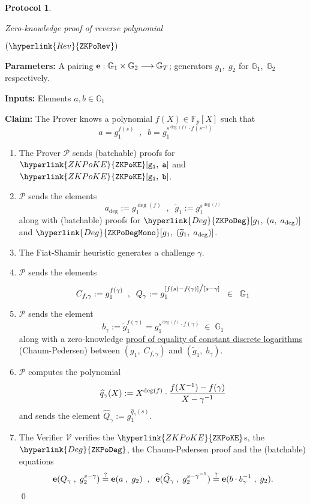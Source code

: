 \documentclass[11pt, lettersize, notitlepage, leqno, footskip=0.6cm]{article}
\newcommand{\bFp}{\mathbb{F}_p}
\newcommand{\lra}{\longrightarrow}
\newcommand{\wti}{\widetilde}
\newcommand{\mc}{\mathcal}
\newcommand{\mb}{\mathbb}
\newcommand{\mbf}{\mathbf}
\newcommand{\what}{\widehat}
\newcommand{\mP}{\mc{P}}
\newcommand{\V}{\mc{V}}
\newcommand{\vs}{\vspace{-0.15cm}}
\newcommand{\noin}{\noindent}
\newcommand{\sta}{\stackrel{?}{=}}
\newcommand{\e}{\mbf{e}}
\newtheorem{Prot}[Thm]{Protocol}
\numberwithin{equation}{section}
\begin{document}
\begin{mdframed}
\begin{Prot} \hypertarget{Rev}{Zero-knowledge proof of reverse polynomial} $(\hyperlink{Rev}{\tt{ZKPoRev}})$\end{Prot}  

\noin \textbf{Parameters:} A pairing ${\bf{e}}:\mb{G}_1\times \mb{G}_2\lra \mb{G}_T$; generators $g_1,\;g_2$ for $\mb{G}_1,\; \mb{G}_2$ respectively.


\noindent \textbf{Inputs:} Elements $a, b \in \mb{G}_1$

\noin \textbf{Claim:} The Prover knows a polynomial $f(X)\in \bFp[X]$ such that \vs $$ a = g_1^{f(s)}\;\;,\;\;b = g_1^{s^{\deg(f)} \cdot f(s^{-1})}  $$

\begin{enumerate}[wide, labelwidth=!, labelindent=0pt, itemsep=-0.2ex]

\item The Prover $\mP$ sends (batchable) proofs for $\hyperlink{ZKPoKE}{\tt{ZKPoKE}}[g_1,\;a]$ and $\hyperlink{ZKPoKE}{\tt{ZKPoKE}}[g_1,\;b]$.

\item $\mP$ sends the elements $$a_{\deg}:= g_1^{\deg(f)}\;\;, \;\; \wti{g}_1:= g_1^{s^{\deg(f)}}  $$ along with (batchable) proofs for $\hyperlink{Deg}{\tt{ZKPoDeg}}[g_1,\;(a,\;a_{\deg})]$ and $\hyperlink{Deg}{\tt{ZKPoDegMono}}[g_1,\;(\wti{g}_1,\;a_{\deg})]$.

\item The Fiat-Shamir heuristic generates a challenge $\gamma$.

\item $\mP$ sends the elements \vspace{-3mm} $$C_{f,\gamma}:= g_1^{f(\gamma)}\;\;,\;\; Q_{\gamma}:= g_1^{[f(s)-f(\gamma)]\big/[s-\gamma]}\;\;\in\;\;\mb{G}_1 \vs $$

\item $\mP$ sends the element $$b_{\gamma}:= \wti{g}_1^{f(\gamma)} = g_1^{s^{\deg(f)}\cdot f(\gamma)}\;\in\;\mb{G}_1 $$ along with a zero-knowledge \hyperlink{CP}{proof of equality of constant discrete logarithms} (Chaum-Pedersen) between $(g_1,\; C_{f,\gamma})$ and $(\wti{g}_1,\; b_{\gamma})$.

\item $\mP$ computes the polynomial \vspace{-2mm} $$\what{q}_{\gamma}(X):= X^{\deg(f)}\cdot \frac{f(X^{-1}) - f(\gamma)}{X-\gamma^{-1}} \vs $$ and sends the element $\what{Q}_{\gamma}:= g_1^{\what{q}_{\gamma}(s)}$. 

\item The Verifier $\V$ verifies the $\hyperlink{ZKPoKE}{\tt{ZKPoKE}}$s, the $\hyperlink{Deg}{\tt{ZKPoDeg}}$, the Chaum-Pedersen proof and the (batchable) equations \vs $$ \e(Q_{\gamma}\;,\;g_2^{s-\gamma})\sta \e(a\;,\;g_2)  \;\;,\;\;\e(\what{Q}_{\gamma}\;,\;g_2^{s-\gamma^{-1}})\sta \e(b\cdot b_{\gamma}^{-1}\;,\;g_2).\vs  $$ \qed \end{enumerate} \end{mdframed}
\end{document}
